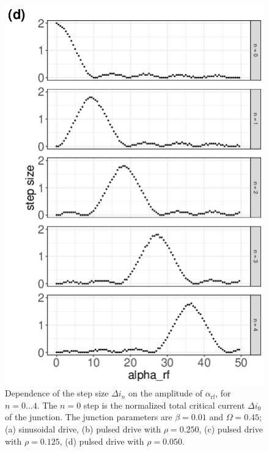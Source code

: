 \begin{figure}[!p]
	\includegraphics[width = 0.45 \textwidth]{images/PULS0050.png}
	\caption{Dependence of the step size $\Delta i_n$ on the amplitude of $\alpha_\mathrm{rf}$, for $n = 0. . . 4$. The $n = 0$ step is the normalized total critical current $\Delta i_0$ of the junction. The junction parameters are $\beta = 0. 01$ and $\Omega = 0. 45$; (a) sinusoidal drive, (b) pulsed drive with $\rho = 0. 250$, (c) pulsed drive with $\rho = 0. 125$, (d) pulsed drive with $\rho = 0. 050$.}
	\label{fig:step-width}
\end{figure}

